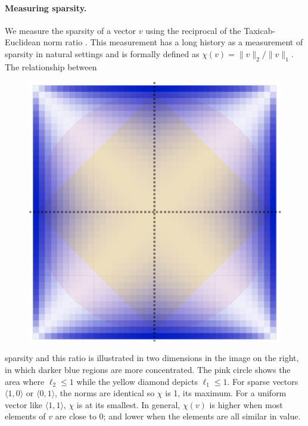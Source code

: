 \paragraph{Measuring sparsity.}
We measure the sparsity of a vector $v$ using the reciprocal of the Taxicab-Euclidean norm ratio \cite{repetti2015euclid}. This measurement has a long history as a measurement of sparsity in natural settings \cite{zibulevsky2001blind,hoyer2004non,pham2017noise,yin2014ratio} and is formally defined as $\chi(v) = \|v \|_2 / \|v \|_1$.
The relationship between\begin{figure}\vspace{-3mm}
\begin{center}
\includegraphics[scale=0.11]{sparsity/diamond}
\end{center}\vspace{-3mm}
\end{figure}
sparsity and this ratio is illustrated in two dimensions in the image on the right, in which darker blue regions are more concentrated. The pink circle shows the area where $\ell_2 \leq 1$ while the yellow diamond depicts $\ell_1 \leq 1$. For sparse vectors  $\langle 1, 0\rangle$ or $\langle 0, 1\rangle$, the norms are identical so $\chi$ is 1, its maximum. For a uniform vector like $\langle 1, 1\rangle$, $\chi$ is at its smallest. In general, $\chi(v)$ is higher when most elements of $v$ are close to 0; and lower when the elements are all similar in value.


